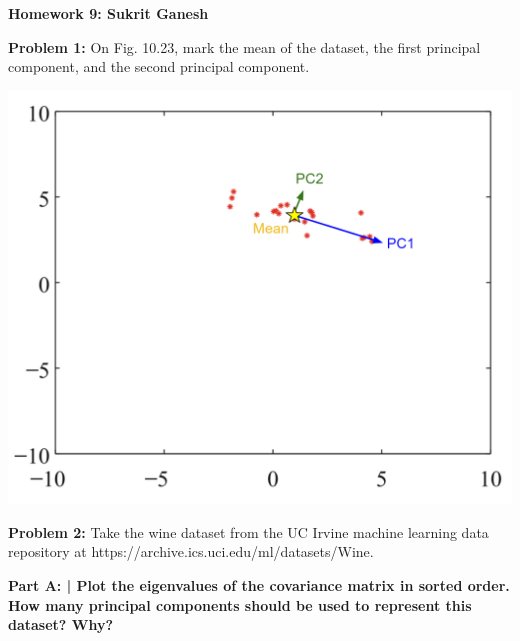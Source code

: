 \documentclass{article}
\begin{document}
 
 \begin{center}
     \Huge\textbf{Homework 9: Sukrit Ganesh}\par
 \end{center}
 
  \noindent\makebox[\linewidth]{\rule{\paperwidth}{0.4pt}}\newline
 
 \begin{center}
      \Large\textbf{Problem 1:} On Fig. 10.23, mark the mean of the dataset, the first principal component, and the second principal component. \par
 \end{center}
 
 
 \includegraphics[scale=0.8]{HW9_1.PNG}
 
 
 \newpage
 
 \noindent\makebox[\linewidth]{\rule{\paperwidth}{0.4pt}}\newline
 
 \begin{center}
      \Large\textbf{Problem 2:} Take the wine dataset from the UC Irvine machine learning data repository at https://archive.ics.uci.edu/ml/datasets/Wine. \par
 \end{center}
 
 \textbf{Part A: | Plot the eigenvalues of the covariance matrix in sorted order. How many principal components should be used to represent this dataset? Why?}\newline
 
\end{document}
